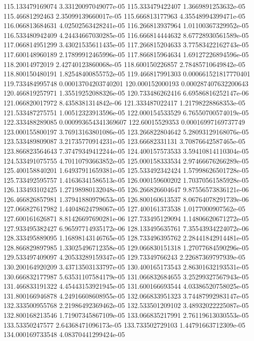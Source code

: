 {115.133479169074 3.33120097049077e-05
115.333479422407 1.3669891253632e-05
115.46681292463 2.35099139660017e-05
115.666813177963 4.35548994399471e-05
116.066813684631 4.02502563428241e-05
116.266813937964 1.01100367329952e-05
116.533480942409 4.24434667030285e-05
116.666814444632 8.67728930561589e-05
117.066814951299 3.43021535611435e-05
117.266815204633 3.77583422162743e-05
117.600148960189 2.17899912465996e-05
117.866815964634 1.69127226894596e-05
118.20014972019 2.42740123860068e-05
118.600150226857 2.78485710649842e-05
118.800150480191 1.82548400855752e-05
119.466817991303 0.000661521817770401
119.733484995748 0.00013704203740201
120.000152000193 0.000287407632200643
120.466819257971 1.35519252088326e-05
120.733486262416 6.69586816252147e-06
121.066820017972 8.4358381314842e-06
121.333487022417 1.21798228868353e-05
121.533487275751 1.00512323913596e-05
122.000154533529 6.76550700574019e-05
122.333488289085 0.000993654341369607
122.60015529353 0.00016997169737749
123.000155800197 3.76913163801086e-05
123.266822804642 5.28093129168076e-05
123.533489809087 3.21735770914231e-05
123.66682331131 3.70876642587465e-05
123.866823564643 7.37479349412244e-05
124.400157573533 3.59410814110304e-05
124.533491075755 4.70110793663852e-05
125.000158333534 2.97466676266289e-05
125.400158840201 1.64937911659381e-05
125.533492342424 1.57998626501728e-05
125.733492595757 1.41636341586513e-05
126.000159600202 1.70370561585928e-05
126.133493102425 1.27198980132048e-05
126.266826604647 9.87556573836121e-06
126.466826857981 1.37941880979653e-05
126.800160613537 8.06764078291739e-06
127.066827617982 1.44048624798067e-05
127.400161373538 1.0177000907562e-05
127.600161626871 8.81426697690281e-06
127.733495129094 1.14806620671272e-05
127.933495382427 6.96597714935172e-06
128.133495635761 7.35543934224072e-06
128.333495889095 1.16898143146765e-05
128.733496395762 2.28441842914481e-05
128.866829897985 1.33025496712358e-05
129.066830151318 1.27077684590296e-05
129.533497409097 4.20533289159347e-05
129.73349766243 2.22687369797939e-05
130.200164920209 3.43713503133797e-05
130.400165173543 2.86301632193531e-05
130.666832177987 5.63531107584179e-05
131.066832684655 3.25299327567943e-05
131.466833191322 4.45443153921945e-05
131.600166693544 4.03386520758025e-05
131.800166946878 4.24916608608955e-05
132.066833951323 3.74487992983147e-05
132.333500955768 2.21986492369462e-05
132.533501209102 3.48932022225087e-05
132.800168213546 1.71907345867109e-05
133.066835217991 2.76119613030553e-05
133.53350247577 2.64368471096173e-05
133.733502729103 1.44791663712309e-05
134.000169733548 4.08370441299424e-05
}
